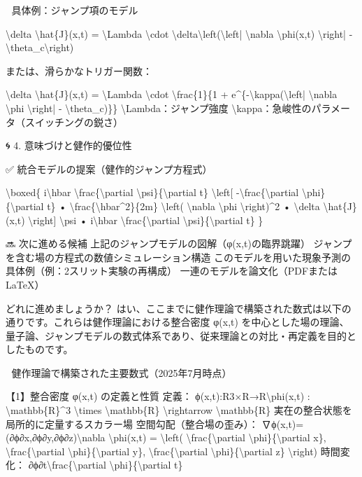 \documentclass{article}
\begin{document}
📌 具体例：ジャンプ項のモデル

\textbackslash{}delta \textbackslash{}hat\{J\}(x,t) = \textbackslash{}Lambda \textbackslash{}cdot \textbackslash{}delta\textbackslash{}left(\textbackslash{}left| \textbackslash{}nabla \textbackslash{}phi(x,t) \textbackslash{}right| - \textbackslash{}theta\_c\textbackslash{}right)

または、滑らかなトリガー関数：

\textbackslash{}delta \textbackslash{}hat\{J\}(x,t) = \textbackslash{}Lambda \textbackslash{}cdot \textbackslash{}frac\{1\}\{1 + e\textasciicircum{}\{-\textbackslash{}kappa(\textbackslash{}left| \textbackslash{}nabla \textbackslash{}phi \textbackslash{}right| - \textbackslash{}theta\_c)\}\}
\textbackslash{}Lambda：ジャンプ強度
\textbackslash{}kappa：急峻性のパラメータ（スイッチングの鋭さ）

🌀 4. 意味づけと健作的優位性

✅ 統合モデルの提案（健作的ジャンプ方程式）

\textbackslash{}boxed\{ i\textbackslash{}hbar \textbackslash{}frac\{\textbackslash{}partial \textbackslash{}psi\}\{\textbackslash{}partial t\} \textbackslash{}left[ -\textbackslash{}frac\{\textbackslash{}partial \textbackslash{}phi\}\{\textbackslash{}partial t\} • \textbackslash{}frac\{\textbackslash{}hbar\textasciicircum{}2\}\{2m\} \textbackslash{}left( \textbackslash{}nabla \textbackslash{}phi \textbackslash{}right)\textasciicircum{}2 • \textbackslash{}delta \textbackslash{}hat\{J\}(x,t) \textbackslash{}right] \textbackslash{}psi • i\textbackslash{}hbar \textbackslash{}frac\{\textbackslash{}partial \textbackslash{}psi\}\{\textbackslash{}partial t\} \}

🔜 次に進める候補
上記のジャンプモデルの図解（φ(x,t)の臨界跳躍）
ジャンプを含む場の方程式の数値シミュレーション構造
このモデルを用いた現象予測の具体例（例：2スリット実験の再構成）
一連のモデルを論文化（PDFまたはLaTeX）

どれに進めましょうか？
はい、ここまでに健作理論で構築された数式は以下の通りです。これらは健作理論における整合密度 φ(x,t) を中心とした場の理論、量子論、ジャンプモデルの数式体系であり、従来理論との対比・再定義を目的としたものです。

📐 健作理論で構築された主要数式（2025年7月時点）

【1】整合密度 φ(x,t) の定義と性質
定義：
ϕ(x,t):R3×R→R\textbackslash{}phi(x,t) : \textbackslash{}mathbb\{R\}\textasciicircum{}3 \textbackslash{}times \textbackslash{}mathbb\{R\} \textbackslash{}rightarrow \textbackslash{}mathbb\{R\} 
実在の整合状態を局所的に定量するスカラー場
空間勾配（整合場の歪み）：
∇ϕ(x,t)=(∂ϕ∂x,∂ϕ∂y,∂ϕ∂z)\textbackslash{}nabla \textbackslash{}phi(x,t) = \textbackslash{}left( \textbackslash{}frac\{\textbackslash{}partial \textbackslash{}phi\}\{\textbackslash{}partial x\}, \textbackslash{}frac\{\textbackslash{}partial \textbackslash{}phi\}\{\textbackslash{}partial y\}, \textbackslash{}frac\{\textbackslash{}partial \textbackslash{}phi\}\{\textbackslash{}partial z\} \textbackslash{}right) 
時間変化：
∂ϕ∂t\textbackslash{}frac\{\textbackslash{}partial \textbackslash{}phi\}\{\textbackslash{}partial t\} 
\end{document}
